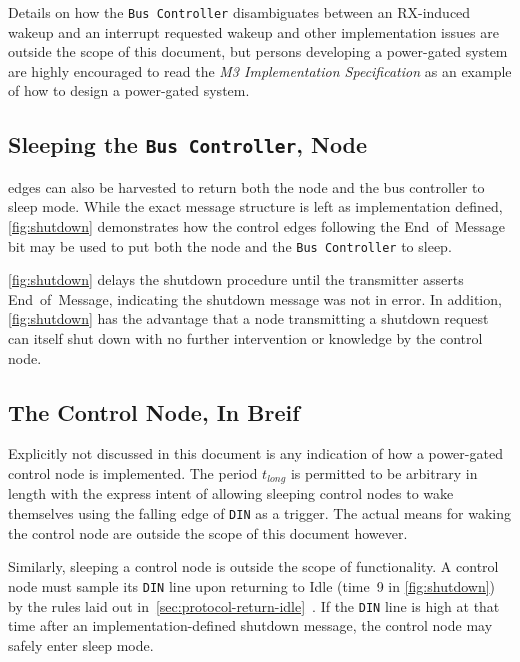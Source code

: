 Details on how the {\tt Bus~Controller} disambiguates between an RX-induced
wakeup and an interrupt requested wakeup and other implementation issues are
outside the scope of this document, but persons developing a power-gated
system are highly encouraged to read the {\em \bus M3 Implementation
Specification} as an example of how to design a power-gated system.

\begin{figure}
  \figTimingInducedGlitch
\end{figure}

\subsection{Sleeping the {\tt Bus Controller}, Node}
\bus edges can also be harvested to return both the node and the bus
controller to sleep mode. While the exact message structure is left as
implementation defined, \autoref{fig:shutdown} demonstrates how the control
edges following the End~of~Message bit may be used to put both the node and
the {\tt Bus~Controller} to sleep.

\autoref{fig:shutdown} delays the shutdown procedure until the transmitter
asserts End~of~Message, indicating the shutdown message was not in error.
In addition, \autoref{fig:shutdown} has the advantage that a node transmitting
a shutdown request can itself shut down with no further intervention or
knowledge by the control node.

\begin{figure}
  \figTimingShutdown
\end{figure}

\subsection{The Control Node, In Breif}
Explicitly not discussed in this document is any indication of how a
power-gated control node is implemented. The period $t_{long}$ is permitted to
be arbitrary in length with the express intent of allowing sleeping control
nodes to wake themselves using the falling edge of {\tt DIN} as a trigger. The
actual means for waking the control node are outside the scope of this
document however.

Similarly, sleeping a control node is outside the scope of \bus functionality.
A control node must sample its {\tt DIN} line upon returning to Idle (time~9
in \autoref{fig:shutdown}) by the rules laid out
in~\ref{sec:protocol-return-idle}~. If the
{\tt DIN} line is high at that time after an implementation-defined shutdown
message, the control node may safely enter sleep mode.
